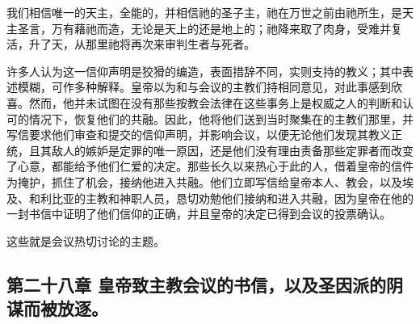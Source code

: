我们相信唯一的天主，全能的，并相信祂的圣子主，祂在万世之前由祂所生，是天主圣言，万有藉祂而造，无论是天上的还是地上的；祂降来取了肉身，受难并复活，升了天，从那里祂将再次来审判生者与死者。\par

\par

许多人认为这一信仰声明是狡猾的编造，表面措辞不同，实则支持的教义；其中表述模糊，可作多种解释。皇帝以为和与会议的主教们持相同意见，对此事感到欣喜。然而，他并未试图在没有那些按教会法律在这些事务上是权威之人的判断和认可的情况下，恢复他们的共融。因此，他将他们送到当时聚集在的主教们那里，并写信要求他们审查和提交的信仰声明，并影响会议，以便无论他们发现其教义正统，且其敌人的嫉妒是定罪的唯一原因，还是他们没有理由责备那些定罪者而改变了心意，都能给予他们仁爱的决定。那些长久以来热心于此的人，借着皇帝的信件为掩护，抓住了机会，接纳他进入共融。他们立即写信给皇帝本人、教会，以及埃及、和利比亚的主教和神职人员，恳切劝勉他们接纳和进入共融，因为皇帝在他的一封书信中证明了他们信仰的正确，并且皇帝的决定已得到会议的投票确认。\par

这些就是会议热切讨论的主题。\par


\subsection{第二十八章 皇帝致主教会议的书信，以及圣因派的阴谋而被放逐。}

